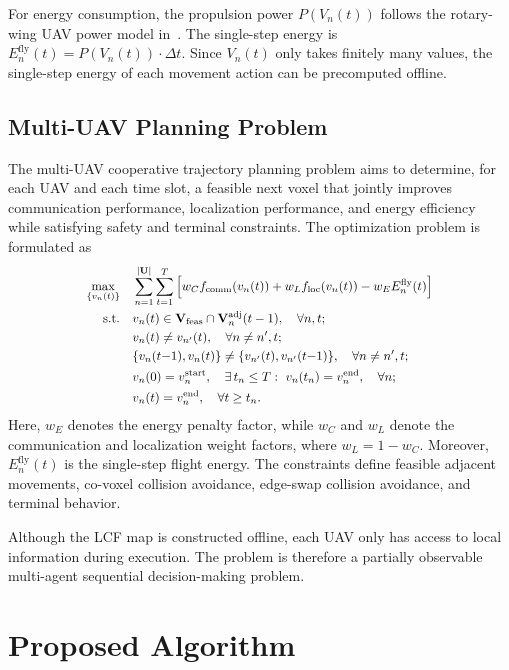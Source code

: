 \documentclass[10pt,journal,letterpaper]{IEEEtran}
\begin{document}
For energy consumption, the propulsion power $P(V_n(t))$ follows the rotary-wing UAV power model in~\cite{ref13}. The single-step energy is $E_n^{\mathrm{fly}}(t)=P(V_n(t))\cdot\Delta t$. Since $V_n(t)$ only takes finitely many values, the single-step energy of each movement action can be precomputed offline.

\subsection{Multi-UAV Planning Problem}

The multi-UAV cooperative trajectory planning problem aims to determine, for each UAV and each time slot, a feasible next voxel that jointly improves communication performance, localization performance, and energy efficiency while satisfying safety and terminal constraints. The optimization problem is formulated as
\begin{equation}
\scalebox{0.90}{$\displaystyle
\begin{aligned}
\max_{\{v_n(t)\}}\quad
& \sum_{n=1}^{|\mathbf{U}|}\sum_{t=1}^{T}
\Big[
w_C f_{\mathrm{comm}}(v_n(t))
+ w_L f_{\mathrm{loc}}(v_n(t))
- w_E E_n^{\mathrm{fly}}(t)
\Big] \\
\mathrm{s.t.}\quad
& v_n(t)\in
\mathbf{V}_{\mathrm{feas}}\cap
\mathbf{V}_n^{\mathrm{adj}}(t-1),
\quad \forall n,t;\\
& v_n(t)\neq v_{n'}(t),
\quad \forall n\neq n',t;\\
& \{v_n(t{-}1),v_n(t)\}\neq
\{v_{n'}(t),v_{n'}(t{-}1)\},\quad \forall n\neq n',t;\\
& v_n(0)=v_n^{\mathrm{start}},\quad
\exists\,t_n\le T:\ v_n(t_n)=v_n^{\mathrm{end}},\quad \forall n;\\
& v_n(t)=v_n^{\mathrm{end}},\quad \forall t\ge t_n .
\end{aligned}
$}
\end{equation}
Here, $w_E$ denotes the energy penalty factor, while $w_C$ and $w_L$ denote the communication and localization weight factors, where $w_L=1-w_C$. Moreover, $E_n^{\mathrm{fly}}(t)$ is the single-step flight energy. The constraints define feasible adjacent movements, co-voxel collision avoidance, edge-swap collision avoidance, and terminal behavior.

Although the LCF map is constructed offline, each UAV only has access to local information during execution. The problem is therefore a partially observable multi-agent sequential decision-making problem. 

\section{Proposed Algorithm}
\end{document}
